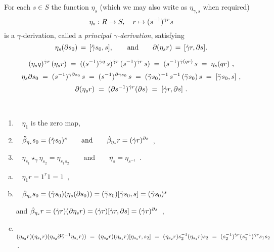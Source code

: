 \begin{lem} \label{lem:gamma-eta_s}
For each $s \in S$ the function $\eta_s$ 
(which we may also write as $\eta_{\gamma,s}$ when required)  
$$
\eta_s : R \to S, \quad r \mapsto (s^{-1})^{\dot{\gamma} r} s 
$$  
is a $\gamma$-derivation, 
  
called a \emph{principal $\gamma$-derivation}, satisfying   
$$
\eta_s(\partial s_0) \,=\, [\ddot{\gamma} s_0,s], 
\qquad\mbox{and}\qquad 
\partial(\eta_s r) \,=\, [\dot{\gamma} r, \partial s].
$$
\end{lem}
\begin{pf} 
$$
(\eta_s q)^{\dot{\gamma} r}\,(\eta_s r) 
  \;=\; ((s^{-1})^{\dot{\gamma} q}\,s)^{\dot{\gamma} r}\,(s^{-1})^{\dot{\gamma} r}\,s)
  \;=\; (s^{-1})^{\dot{\gamma}(qr)}\,s  \;=\;  \eta_s(qr) ~,
$$
$$
\eta_s \partial s_0 \;=\; (s^{-1})^{\dot{\gamma} \partial s_0}\,s
                    \;=\; (s^{-1})^{\partial \ddot{\gamma} s_0}\,s
                    \;=\; (\ddot{\gamma} s_0)^{-1}\,s^{-1}\,(\ddot{\gamma} s_0)\,s
                    \;=\; [\ddot{\gamma} s_0,s]~,
$$
$$
\partial(\eta_s r)  \;=\; (\partial s^{-1})^{\dot{\gamma} r}(\partial s) 
                    \;=\; [\dot{\gamma} r, \partial s]~.
$$
\end{pf}

\begin{lem} \label{lem:princ-prop}
\mbox{}\\
\vspace{-5mm}
\begin{enumerate}[{\rm (a)}]
\item~
$\eta_1$ is the zero map,
\item~
$\ddot{\beta}_{\eta_s}s_0 = (\ddot{\gamma} s_0)^s 
\qquad\mbox{and}\qquad
\dot{\beta}_{\eta_s}r = (\dot{\gamma} r)^{\partial s}$~,
\item~
$\eta_{s_1} \star_{\gamma} \eta_{s_2} = \eta_{s_1s_2} 
\qquad\mbox{and}\qquad
\overline{\eta_s} = \eta_{s^{-1}}$~.
\end{enumerate}
\end{lem}
\begin{pf}
\begin{enumerate}[(a)]
\item~
$\eta_1 r = 1^r 1 = 1$~,
\item~
$\ddot{\beta}_{\eta_s} s_0 = (\ddot{\gamma} s_0)(\eta_s(\partial s_0))
= (\ddot{\gamma} s_0) [\ddot{\gamma} s_0,s] = (\ddot{\gamma} s_0)^s$  

and \quad 
$\dot{\beta}_{\eta_s}r = (\dot{\gamma} r)(\partial \eta_s r)
= (\dot{\gamma} r) [\dot{\gamma} r, \partial s] 
= (\dot{\gamma} r)^{\partial s}$~,
\item~
$(\eta_{s_2}r)(\eta_{s_1}r)(\eta_{s_2}\partial\ddot{\gamma}^{-1}\eta_{s_1}r)) 
~=~ (\eta_{s_2}r)(\eta_{s_1}r)[\eta_{s_1}r,s_2] 
~=~ (\eta_{s_2}r)s_2^{-1}(\eta_{s_1}r)s_2 
~=~ (s_2^{-1})^{\dot{\gamma} r}(s_1^{-1})^{\dot{\gamma} r}s_1s_2 
$\,.
\end{enumerate}
\end{pf}

